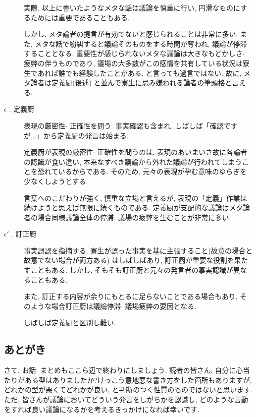 \documentclass[10pt,b5jsbook,dvips,dvipdfmx,openany]{jsbook}
\theoremstyle{definition}
\begin{document}
\begin{description}
			実際, 以上に書いたようなメタな話は議論を慎重に行い, 円滑なものにするためには重要であることもある.

			しかし, メタ論者の提言が有効でないと感じられることは非常に多い. また, メタな話で紛糾すると議論そのものをする時間が奪われ, 議論が停滞することとなる. 重要性が感じられないメタな議論は大きなもどかしさ$ \cdot $ 疲弊の伴うものであり, 議場の大多数がこの感情を共有している状況は寮生であれば誰でも経験したことがある, と言っても過言ではない. 故に, メタ論者は定義厨(後述) と並んで寮生に忌み嫌われる論者の筆頭格と言える.


			\item[$ \epsilon $ . 定義厨]

			表現の厳密性$ \cdot $ 正確性を問う. 事実確認も含まれ, しばしば「確認ですが...」から定義厨の発言は始まる.

			定義厨が表現の厳密性$ \cdot $ 正確性を問うのは, 表現のあいまいさ故に各論者の認識が食い違い, 本来なすべき議論から外れた議論が行われてしまうことを恐れているからである. そのため, 元々の表現が孕む意味のゆらぎを少なくしようとする.

			言葉へのこだわりが強く, 慎重な立場と言えるが, 表現の「定義」作業は続けようと思えば無限に続くものである. 定義厨が支配的な議論はメタ論者の場合同様議論全体の停滞, 議場の疲弊を生むことが非常に多い.


			\item[$ \epsilon ' $ . 訂正厨]

			事実誤認を指摘する. 寮生が誤った事実を基に主張すること(故意の場合と故意でない場合が両方ある) はしばしばあり, 訂正厨が重要な役割を果たすこともある. しかし, そもそも訂正厨と元々の発言者の事実認識が異なることもある.

			また, 訂正する内容が余りにもとるに足らないことである場合もあり, そのような場合訂正厨は議論停滞$ \cdot $ 議場疲弊の要因となる.

			しばしば定義厨と区別し難い.

			\end{description}

		\subsection{あとがき}
		さて, お話$ \cdot $ まとめもここら辺で終わりにしましょう.
		読者の皆さん, 自分に心当たりがある型はありましたか?けっこう意地悪な書き方をした箇所もありますが, どれかの型が悪くてどれかが良い, と判断のつく性質のものではないと思います. ただ, 皆さんが議論においてどういう発言をしがちかを認識し, どのような言動をすれば良い議論になるかを考えるきっかけになれば幸いです.
\end{document}
